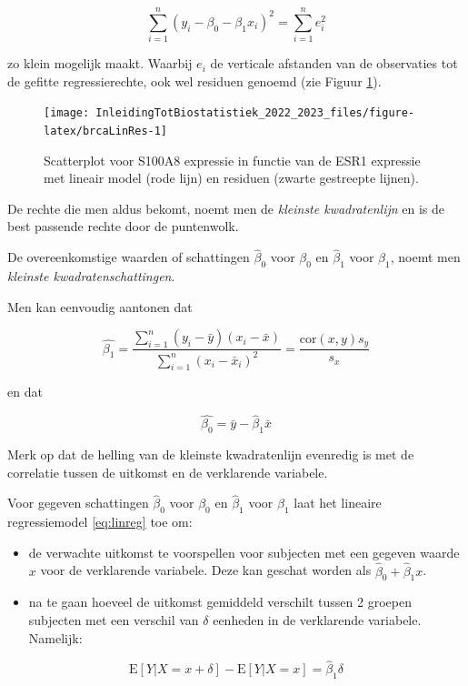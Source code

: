 \documentclass[
  12pt,dutch,coursenotes]{book}
\providecommand{\tightlist}{%
  \setlength{\itemsep}{0pt}\setlength{\parskip}{0pt}}
\begin{document}
\[\sum_{i=1}^n (y_i-\beta_0-\beta_1 x_i)^2=\sum_{i=1}^n e_i^2\]

zo klein mogelijk maakt. Waarbij \(e_i\) de verticale afstanden van de observaties tot de gefitte regressierechte, ook wel residuen genoemd (zie Figuur \ref{fig:brcaLinRes}).

\begin{figure}

{\centering \texttt{[image: InleidingTotBiostatistiek\_2022\_2023\_files/figure-latex/brcaLinRes-1]} 

}

\caption{Scatterplot voor S100A8 expressie in functie van de ESR1 expressie met lineair model (rode lijn) en residuen (zwarte gestreepte lijnen).}\label{fig:brcaLinRes}
\end{figure}

De rechte die men aldus bekomt, noemt men de
\emph{kleinste kwadratenlijn} en is de best passende rechte door de puntenwolk.

De overeenkomstige waarden of schattingen \(\hat{\beta}_0\) voor \(\beta_0\) en \(\hat{\beta}_1\) voor \(\beta_1\), noemt men \emph{kleinste kwadratenschattingen}.

Men kan eenvoudig aantonen dat

\[\hat{\beta_1}= \frac{\sum\limits_{i=1}^n (y_i-\bar y)(x_i-\bar x)}{\sum\limits_{i=1}^n (x_i-\bar x_i)^2}=\frac{\mbox{cor}(x,y)s_y}{s_x} \]

en dat

\[\hat{\beta_0}=\bar y - \hat{\beta}_1 \bar x \]

Merk op dat de helling van de kleinste kwadratenlijn evenredig is met de correlatie tussen de uitkomst en de verklarende variabele.

Voor gegeven schattingen \(\hat{\beta}_0\) voor \(\beta_0\) en \(\hat{\beta}_1\) voor \(\beta_1\) laat het lineaire regressiemodel \eqref{eq:linreg} toe om:

\begin{itemize}
\tightlist
\item
  de verwachte uitkomst te voorspellen voor subjecten met een gegeven
  waarde \(x\) voor de verklarende variabele. Deze kan geschat worden als \(\hat{\beta}_0+\hat{\beta}_1x\).
\item
  na te gaan hoeveel de uitkomst gemiddeld verschilt tussen 2 groepen subjecten met een verschil van \(\delta\) eenheden in de verklarende variabele. Namelijk:
\end{itemize}

\[\text{E}\left[Y|X=x+\delta\right]-\text{E}\left[Y|X=x\right]= \hat{\beta}_1\delta\]
\end{document}
